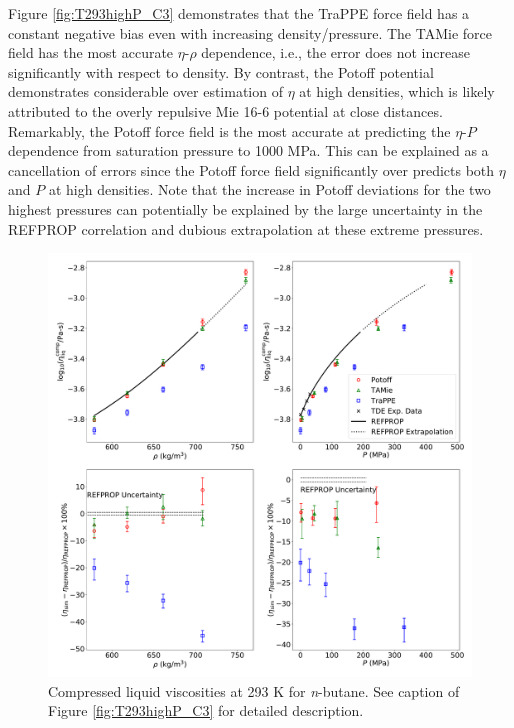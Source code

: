 \documentclass[preprint,review,12pt]{elsarticle}
\begin{document}
	
	Figure \ref{fig:T293highP_C3} demonstrates that the TraPPE force field has a constant negative bias even with increasing density/pressure. The TAMie force field has the most accurate $\eta$-$\rho$ dependence, i.e., the error does not increase significantly with respect to density. By contrast, the Potoff potential demonstrates considerable over estimation of $\eta$ at high densities, which is likely attributed to the overly repulsive Mie 16-6 potential at close distances. Remarkably, the Potoff force field is the most accurate at predicting the $\eta$-$P$ dependence from saturation pressure to 1000 MPa. This can be explained as a cancellation of errors since the Potoff force field significantly over predicts both $\eta$ and $P$ at high densities. Note that the increase in Potoff deviations for the two highest pressures can potentially be explained by the large uncertainty in the REFPROP correlation and dubious extrapolation at these extreme pressures.
	
	\begin{figure}[htb!]
		\centering
		\includegraphics[width=6.4in]{compare_REFPROP_T293highP_C4H10.pdf}
		\caption{Compressed liquid viscosities at 293 K for \textit{n}-butane. See caption of Figure \ref{fig:T293highP_C3} for detailed description.}
		\label{fig:T293highP_C4}
	\end{figure} 
	
\end{document}
